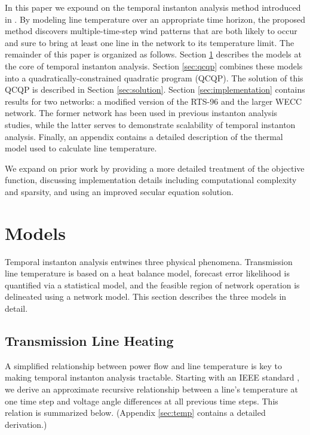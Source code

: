\documentclass[journal,twoside]{IEEEtran}
\begin{document}
In this paper we expound on the temporal instanton analysis method introduced in \cite{kersulis2015}. By modeling line temperature over an appropriate time horizon, the proposed method discovers multiple-time-step wind patterns that are both likely to occur and sure to bring at least one line in the network to its temperature limit. The remainder of this paper is organized as follows. Section \ref{sec:models} describes the models at the core of temporal instanton analysis. Section \ref{sec:qcqp} combines these models into a quadratically-constrained quadratic program (QCQP). The solution of this QCQP is described in Section \ref{sec:solution}. Section \ref{sec:implementation}  contains results for two networks: a modified version of the RTS-96 and the larger WECC network. The former network has been used in previous instanton analysis studies, while the latter serves to demonstrate scalability of temporal instanton analysis. Finally, an appendix contains a detailed description of the thermal model used to calculate line temperature.

We expand on prior work by providing a more detailed treatment of the objective function, discussing implementation details including computational complexity and sparsity, and using an improved secular equation solution.

\section{Models}\label{sec:models}
Temporal instanton analysis entwines three physical phenomena. Transmission line temperature is based on a heat balance model, forecast error likelihood is quantified via a statistical model, and the feasible region of network operation is delineated using a network model. This section describes the three models in detail.

\subsection{Transmission Line Heating}\label{sec:models-heat}
A simplified relationship between power flow and line temperature is key to making temporal instanton analysis tractable. Starting with an IEEE standard \cite{ieee2013}, we derive an approximate recursive relationship between a line's temperature at one time step and voltage angle differences at all previous time steps. This relation is summarized below. (Appendix \ref{sec:temp} contains a detailed derivation.)
\end{document}
